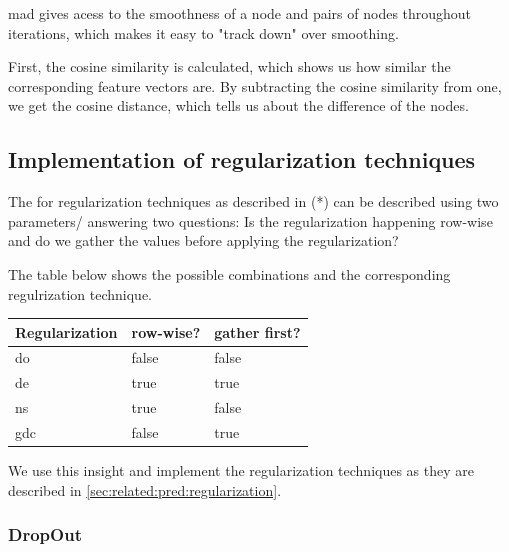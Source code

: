 \Ac{mad} gives acess to the smoothness of a node and pairs of nodes throughout iterations, which makes it easy to "track down" over smoothing.

First, the cosine similarity is calculated, which shows us how similar the corresponding feature vectors are. By subtracting the cosine similarity from one, we get the cosine distance, which tells us about the difference of the nodes.


\subsection{Implementation of regularization techniques}
\label{sec:implement:setup: regularization}



The for regularization techniques as described in (*)
can be described using two parameters/ answering two questions: Is the regularization happening row-wise and do we gather the values before applying the regularization?

The table below shows the possible combinations and the corresponding regulrization technique.
\begin{center}
    \begin{tabular}{lll}
        \toprule
        \textbf{Regularization} & \textbf{row-wise?} & \textbf{gather first?} \\
        \midrule
        \acf{do}                & false              & false                  \\
        \acf{de}                & true               & true                   \\
        \acf{ns}                & true               & false                  \\
        \acf{gdc}               & false              & true                   \\

        \bottomrule
    \end{tabular}
\end{center}


We use this insight and implement the regularization techniques as they are described in \cref{sec:related:pred:regularization}.

\subsubsection{DropOut}

